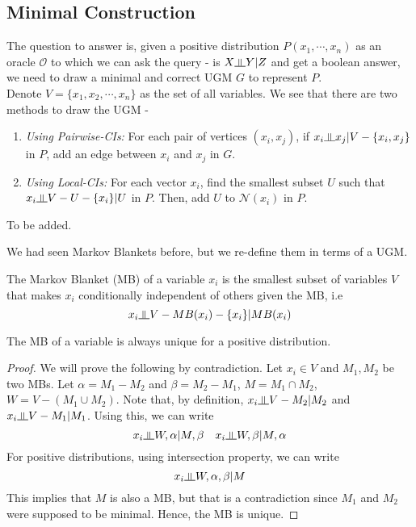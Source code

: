 \subsection{Minimal Construction}
The question to answer is, given a positive distribution $P(x_1, \cdots, x_n)$ as an oracle $\mathscr{O}$ to which we can ask the query - is $X\ind Y|Z$ and get a boolean answer, we need to draw a minimal and correct UGM $G$ to represent $P$. \\
Denote $V = \{x_1, x_2, \cdots, x_n\}$ as the set of all variables. We see that there are two methods to draw the UGM - 
\begin{enumerate}
	\item \textit{Using Pairwise-CIs:} For each pair of vertices $(x_i, x_j)$, if $x_i \ind x_j | V - \{x_i, x_j\}$ in $P$, add an edge between $x_i$ and $x_j$ in $G$.
	\item \textit{Using Local-CIs:} For each vector $x_i$, find the smallest subset $U$ such that $x_i \ind V - U - \{x_i\}|U$ in $P$. Then, add $U$ to $\mathcal{N}(x_i)$ in $P$.
\end{enumerate}
\begin{exmp}
	To be added.
\end{exmp}
We had seen Markov Blankets before, but we re-define them in terms of a UGM.
\begin{defn}
The Markov Blanket (MB) of a variable $x_i$ is the smallest subset of variables $V$ that makes $x_i$ conditionally independent of others given the MB, i.e
\begin{equation}
x_i \ind V - MB(x_i) - \{x_i\} | MB(x_i)
\end{equation}
\end{defn}
\begin{thm}
The MB of a variable is always unique for a positive distribution.
\end{thm}
\begin{proof}
We will prove the following by contradiction. Let $x_i \in V$ and $M_1, M_2$ be two MBs. Let $\alpha = M_1 - M_2$ and $\beta = M_2 - M_1$, $M = M_1 \cap M_2$, $W = V - (M_1 \cup M_2)$. Note that, by definition, $x_i \ind V-M_2|M_2$ and $x_i \ind V-M_1|M_1$. Using this, we can write
\[x_i \ind W, \alpha|M, \beta \quad x_i \ind W, \beta|M,\alpha\]
For positive distributions, using intersection property, we can write
\[x_i \ind W, \alpha, \beta | M\]
This implies that $M$ is also a MB, but that is a contradiction since $M_1$ and $M_2$ were supposed to be minimal. Hence, the MB is unique.
\end{proof}
